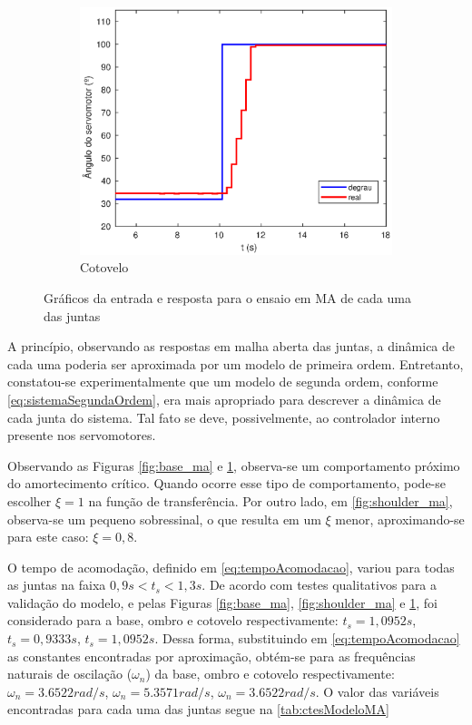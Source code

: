 \newpage

\begin{figure}[h!]\ContinuedFloat
  \begin{subfigure}{\textwidth}
    \centering
    \includegraphics[width = 0.55\columnwidth]{Imagens/forearm_ma}
    \caption{Cotovelo}
    \label{fig:forearm_ma}
  \end{subfigure}%
  \caption{Gráficos da entrada e resposta para o ensaio em MA de cada uma das juntas}
  \label{fig:ensaioMalhaAberta}
\end{figure}

A princípio, observando as respostas em malha aberta das juntas, a dinâmica de cada uma poderia ser aproximada por
um modelo de primeira ordem. Entretanto, constatou-se experimentalmente que um modelo de segunda ordem, 
conforme \eqref{eq:sistemaSegundaOrdem}, era mais apropriado para descrever a dinâmica de cada junta do sistema.
Tal fato se deve, possivelmente, ao controlador interno presente nos servomotores.

Observando as Figuras \ref{fig:base_ma} e \ref{fig:forearm_ma}, observa-se um comportamento próximo do 
amortecimento crítico. Quando ocorre esse tipo de comportamento, pode-se escolher $\xi=1$ na função de 
transferência. Por outro lado, em \ref{fig:shoulder_ma}, observa-se
um pequeno sobressinal, o que resulta em um $\xi$ menor, aproximando-se para este caso: $\xi = 0,8$.

O tempo de acomodação, definido em \eqref{eq:tempoAcomodacao}, variou para todas as juntas na 
faixa $0,9s < t_s < 1,3s$. De acordo com testes qualitativos para a validação do modelo, e pelas Figuras 
\ref{fig:base_ma}, \ref{fig:shoulder_ma} e \ref{fig:forearm_ma}, foi considerado para a base, ombro e
cotovelo respectivamente: $t_s = 1,0952s$, $t_s = 0,9333s$, $t_s = 1,0952s$. Dessa forma, substituindo em 
\eqref{eq:tempoAcomodacao} as constantes encontradas por aproximação, obtém-se para as frequências naturais de
oscilação ($\omega_n$) da base, ombro e
cotovelo respectivamente: $\omega_n = 3.6522 rad/s$, $\omega_n = 5.3571 rad/s$, $\omega_n = 3.6522 rad/s$.
O valor das variáveis encontradas para cada uma das juntas segue na \autoref{tab:ctesModeloMA}

